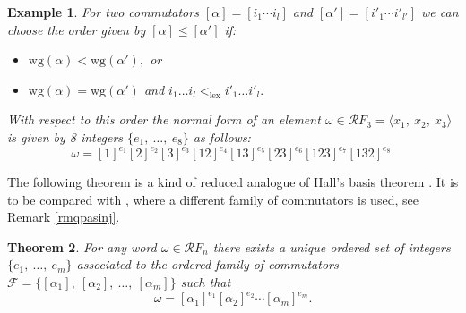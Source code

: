 \documentclass[11pt, a4paper, twoside,reqno]{amsart}
\newtheorem{thm}{Theorem}[section]
\newtheorem{ex}[thm]{Example}
\newcommand\lex{\mathord{\mathrm{lex}}}
\newcommand\wg{\mathord{\mathrm{wg}}}
\begin{document}
\begin{ex}\label{exnormalformcommu}
For two commutators $[\alpha]=[i_1\cdots i_l]$ and $[\alpha']=[i'_1\cdots i'_{l'}]$ we can choose the order given by $[\alpha]\leq[\alpha']$ if:
\begin{itemize}
    \item $\wg(\alpha)<\wg(\alpha'),$ or
    \item $\wg(\alpha)=\wg(\alpha')$ and $i_1\ldots i_l<_{\lex}i'_1\ldots i'_l.$
\end{itemize}
With respect to this order the normal form of an element $\omega\in\mathcal RF_3=\langle x_1,\ x_2,\ x_3\rangle$ is given by 8 integers $\{e_{1},\ \ldots,\ e_{8}\}$ as follows:
\[\omega=[1]^{e_1}[2]^{e_2}[3]^{e_3}[12]^{e_4}[13]^{e_5}[23]^{e_6}[123]^{e_7}[132]^{e_8}.\] 
\end{ex}
The following theorem is a kind of reduced analogue of Hall's basis theorem \cite[Theorem 11.2.4]{Mhall}. It is to be compared with \cite[Proposition 6]{Levine4comp}, where a different family of commutators is used, see Remark \ref{rmqpasinj}. 
\begin{thm}\label{basiscommuthm}
For any word $\omega\in\mathcal RF_n$ there exists a unique ordered set of integers $\{e_1,\ \ldots,\ e_m\}$ associated to the ordered family of commutators $\mathcal{F}=\{[\alpha_1],\ [\alpha_2],\ \ldots,\  [\alpha_m]\}$ such that $$\omega=[\alpha_1]^{e_1}[\alpha_2]^{e_2}\cdots [\alpha_m]^{e_m}.$$
\end{thm}
\end{document}
